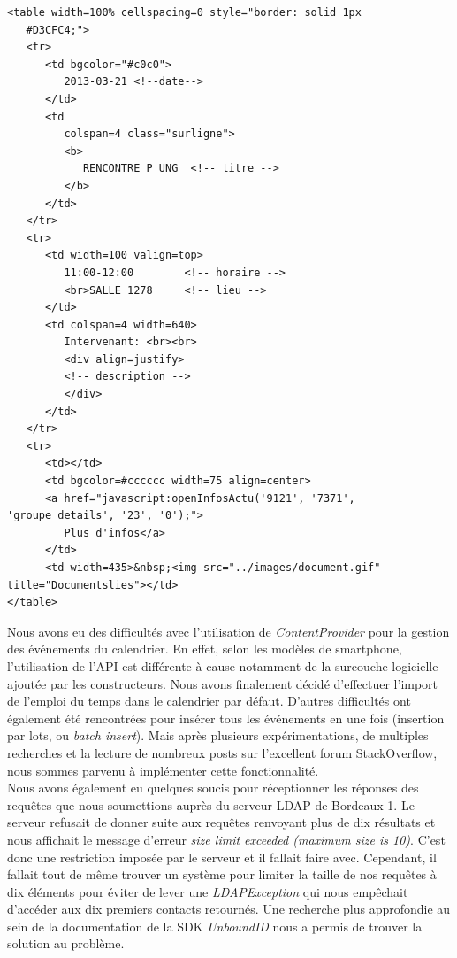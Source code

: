 \begin{adjustbox}{minipage=1.0\textwidth, margin=0pt \smallskipamount, center}
\begin{lstlisting}[style=HTML, label=htmlCode, caption=Exemple d'événement HTML sans contenu (descriptif vide)]
<table width=100% cellspacing=0 style="border: solid 1px 
   #D3CFC4;">
   <tr>
      <td bgcolor="#c0c0">
         2013-03-21 <!--date-->
      </td>
      <td
         colspan=4 class="surligne">
         <b>
            RENCONTRE P UNG  <!-- titre -->
         </b>
      </td>
   </tr>
   <tr>
      <td width=100 valign=top>
         11:00-12:00        <!-- horaire -->
         <br>SALLE 1278     <!-- lieu -->
      </td>
      <td colspan=4 width=640>
         Intervenant: <br><br>
         <div align=justify>
         <!-- description -->
         </div>
      </td>
   </tr>
   <tr>
      <td></td>
      <td bgcolor=#cccccc width=75 align=center>
      <a href="javascript:openInfosActu('9121', '7371', 'groupe_details', '23', '0');">
         Plus d'infos</a>
      </td>
      <td width=435>&nbsp;<img src="../images/document.gif" title="Documentslies"></td>
</table>
\end{lstlisting}
\end{adjustbox}

\wl Nous avons eu des difficultés avec l’utilisation de \emph{ContentProvider} pour la gestion des événements du calendrier. En effet, selon les modèles de smartphone, l’utilisation de l’API est différente à cause notamment de la surcouche logicielle ajoutée par les constructeurs. Nous avons finalement décidé d’effectuer l’import de l’emploi du temps dans le calendrier par défaut. D’autres difficultés ont également été rencontrées pour insérer tous les événements en une fois (insertion par lots, ou \emph{batch insert}). Mais après plusieurs expérimentations, de multiples recherches et la lecture de nombreux posts sur l’excellent forum StackOverflow, nous sommes parvenu à implémenter cette fonctionnalité. \\

Nous avons également eu quelques soucis pour réceptionner les réponses des requêtes que nous soumettions auprès du serveur LDAP de Bordeaux 1. Le serveur refusait de donner suite aux requêtes renvoyant plus de dix résultats et nous affichait le message d'erreur \textit{size limit exceeded (maximum size is 10)}. C'est donc une restriction imposée par le serveur et il fallait faire avec. Cependant, il fallait tout de même trouver un système pour limiter la taille de nos requêtes à dix éléments pour éviter de lever une \textit{LDAPException} qui nous empêchait d'accéder aux dix premiers contacts retournés. Une recherche plus approfondie au sein de la documentation de la SDK \textit{UnboundID} nous a permis de trouver la solution au problème. \\ 

